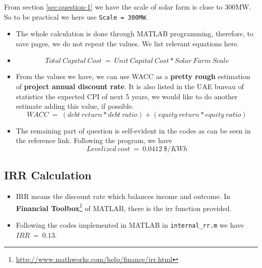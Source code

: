 \documentclass[12pt]{article}
\begin{document}
From section \ref{sec:question-1} we have the scale of solar farm is
close to 300MW. So to be practical we here use \texttt{Scale =
  300MW}.
\begin{itemize}
\item The whole calculation is done through MATLAB programming,
  therefore, to save pages, we do not repeat the values. We list
  relevant equations here.
\item
  \begin{equation}
    \label{eq:12}
    Total~Capital~Cost~=~Unit~Capital~Cost * Solar~Farm~Scale
  \end{equation}
\item From the values we have, we can use WACC as a \textbf{pretty
    rough} estimation of \textbf{project annual discount rate}. It is
  also listed in the UAE bureau of statistics the expected CPI of next
  5 years, we would like to do another estimate adding this value, if
  possible. 
  \begin{equation}
    \label{eq:13}
    WACC~=~(debt~return*debt~ratio)+(equity~return*equity~ratio)
  \end{equation}
\item The remaining part of question is self-evident in the codes as
  can be seen in the reference link. Following the program, we have
  \begin{equation}
    \label{eq:14}
    Levelized~cost~=~0.0412~\$/KWh
  \end{equation}

\end{itemize}

\subsection{IRR Calculation}
\label{sec:irr-calculation}

\begin{itemize}
\item IRR means the discount rate which balances income and
  outcome. In \textbf{Financial
    Toolbox}\footnote{\url{http://www.mathworks.com/help/finance/irr.html}}
  of MATLAB, there is the irr function provided.
\item Following the codes implemented in MATLAB in
  \texttt{internal\_rr.m} we have $IRR~=~0.13$.
\end{itemize}
\end{document}
